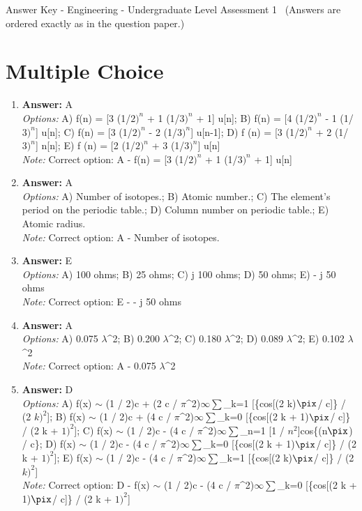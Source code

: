 \documentclass[12pt]{article}
\begin{document}
\begin{center}
Answer Key - Engineering - Undergraduate Level Assessment 1 \
\small (Answers are ordered exactly as in the question paper.)
\end{center}

\section*{Multiple Choice}
\begin{enumerate}[label=\arabic*.]
\item \textbf{Answer:} A
\\ \textit{Options:} A) f(n) = [3 (1/$2)^n$ + 1 (1/$3)^n$ + 1] u[n]; B) f(n) = [4 (1/$2)^n$ - 1 (1/$3)^n$] u[n]; C) f(n) = [3 (1/$2)^n$ - 2 (1/$3)^n$] u[n-1]; D) f (n) = [3 (1/$2)^n$ + 2 (1/$3)^n$] n[n]; E) f (n) = [2 (1/$2)^n$ + 3 (1/$3)^n$] u[n]
\\ \textit{Note:} Correct option: A - f(n) = [3 (1/$2)^n$ + 1 (1/$3)^n$ + 1] u[n]
\item \textbf{Answer:} A
\\ \textit{Options:} A) Number of isotopes.; B) Atomic number.; C) The element's period on the periodic table.; D) Column number on periodic table.; E) Atomic radius.
\\ \textit{Note:} Correct option: A - Number of isotopes.
\item \textbf{Answer:} E
\\ \textit{Options:} A) 100 ohms; B) 25 ohms; C) j 100 ohms; D) 50 ohms; E) - j 50 ohms
\\ \textit{Note:} Correct option: E - - j 50 ohms
\item \textbf{Answer:} A
\\ \textit{Options:} A) 0.075 \ensuremath{\lambda}^2; B) 0.200 \ensuremath{\lambda}^2; C) 0.180 \ensuremath{\lambda}^2; D) 0.089 \ensuremath{\lambda}^2; E) 0.102 \ensuremath{\lambda}^2
\\ \textit{Note:} Correct option: A - 0.075 \ensuremath{\lambda}^2
\item \textbf{Answer:} D
\\ \textit{Options:} A) f(x) \ensuremath{\sim} (1 / 2)c + (2 c / \ensuremath{\pi}^2)\ensuremath{\infty}\ensuremath{\sum}\_k=1 [\{cos[(2 k)\ensuremath{\pix}/ c]\} / (2 $k)^2$]; B) f(x) \ensuremath{\sim} (1 / 2)c + (4 c / \ensuremath{\pi}^2)\ensuremath{\infty}\ensuremath{\sum}\_k=0 [\{cos[(2 k + 1)\ensuremath{\pix}/ c]\} / (2 k + $1)^2$]; C) f(x) \ensuremath{\sim} (1 / 2)c - (4 c / \ensuremath{\pi}^2)\ensuremath{\infty}\ensuremath{\sum}\_n=1 [1 / $n^2$]cos\{(n\ensuremath{\pix}) / c\}; D) f(x) \ensuremath{\sim} (1 / 2)c - (4 c / \ensuremath{\pi}^2)\ensuremath{\infty}\ensuremath{\sum}\_k=0 [\{cos[(2 k + 1)\ensuremath{\pix}/ c]\} / (2 k + $1)^2$]; E) f(x) \ensuremath{\sim} (1 / 2)c - (4 c / \ensuremath{\pi}^2)\ensuremath{\infty}\ensuremath{\sum}\_k=1 [\{cos[(2 k)\ensuremath{\pix}/ c]\} / (2 $k)^2$]
\\ \textit{Note:} Correct option: D - f(x) \ensuremath{\sim} (1 / 2)c - (4 c / \ensuremath{\pi}^2)\ensuremath{\infty}\ensuremath{\sum}\_k=0 [\{cos[(2 k + 1)\ensuremath{\pix}/ c]\} / (2 k + $1)^2$]
\end{enumerate}
\end{document}
